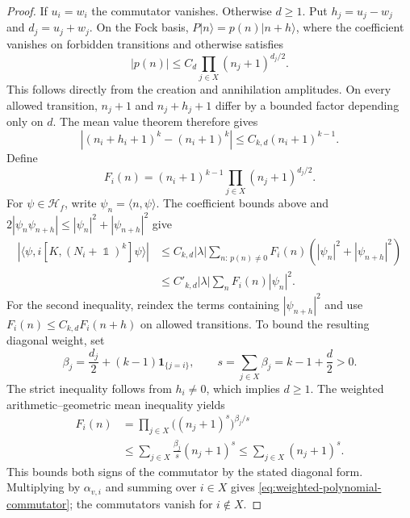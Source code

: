 \documentclass[11pt]{article}
\theoremstyle{myplain}
\theoremstyle{mydefinition}
\theoremstyle{remark}
\DeclareMathOperator{\1}{\mathds{1}}
\begin{document}
        \begin{proof}
            If $u_i=w_i$ the commutator vanishes. Otherwise $d\ge1$. Put $h_j=u_j-w_j$ and $d_j=u_j+w_j$. On the Fock basis, $P|n\rangle=p(n)|n+h\rangle$, where the coefficient vanishes on forbidden transitions and otherwise satisfies
            \begin{equation}
                |p(n)|\le C_d\prod_{j\in X}(n_j+1)^{d_j/2}.
            \end{equation}
            This follows directly from the creation and annihilation amplitudes. On every allowed transition, $n_j+1$ and $n_j+h_j+1$ differ by a bounded factor depending only on $d$. The mean value theorem therefore gives
            \begin{equation}
                |(n_i+h_i+1)^k-(n_i+1)^k|
                \le C_{k,d}(n_i+1)^{k-1}.
            \end{equation}
            Define
            \begin{equation*}
                F_i(n)=(n_i+1)^{k-1}\prod_{j\in X}(n_j+1)^{d_j/2}.
            \end{equation*}
            For $\psi\in\mathcal H_f$, write $\psi_n=\langle n,\psi\rangle$. The coefficient bounds above and $2|\psi_n\psi_{n+h}|\leq|\psi_n|^2+|\psi_{n+h}|^2$ give
            \begin{equation*}
                \begin{aligned}
                    |\langle\psi,i[K,(N_i+\1)^k]\psi\rangle|
                    &\leq C_{k,d}|\lambda|\sum_{n:\,p(n)\ne0}F_i(n)
                    (|\psi_n|^2+|\psi_{n+h}|^2)\\
                    &\leq C'_{k,d}|\lambda|\sum_n F_i(n)|\psi_n|^2.
                \end{aligned}
            \end{equation*}
            For the second inequality, reindex the terms containing $|\psi_{n+h}|^2$ and use $F_i(n)\leq C_{k,d}F_i(n+h)$ on allowed transitions. To bound the resulting diagonal weight, set
            \begin{equation*}
                \beta_j=\frac{d_j}{2}+(k-1)\mathbf{1}_{\{j=i\}},
                \qquad s=\sum_{j\in X}\beta_j=k-1+\frac d2>0.
            \end{equation*}
            The strict inequality follows from $h_i\ne0$, which implies $d\geq1$. The weighted arithmetic--geometric mean inequality yields
            \begin{equation*}
                \begin{aligned}
                    F_i(n)
                    &=\prod_{j\in X}\bigl((n_j+1)^s\bigr)^{\beta_j/s}\\
                    &\leq\sum_{j\in X}\frac{\beta_j}{s}(n_j+1)^s
                    \leq\sum_{j\in X}(n_j+1)^s.
                \end{aligned}
            \end{equation*}
            This bounds both signs of the commutator by the stated diagonal form. Multiplying by $\alpha_{v,i}$ and summing over $i\in X$ gives \eqref{eq:weighted-polynomial-commutator}; the commutators vanish for $i\notin X$.
        \end{proof}
\end{document}
